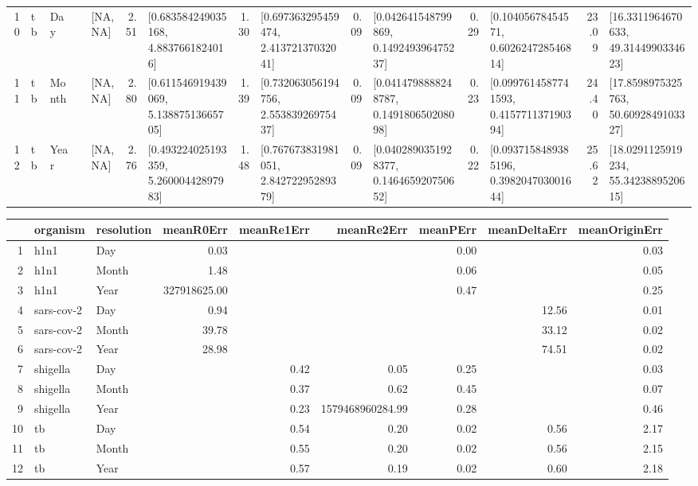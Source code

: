\documentclass{article}
\begin{document}
\begin{spacing}{1.5}
\begin{table}[ht]
\begin{tabular}{rllrlrlrlrlrlrl}
  10 & tb & Day &  & [NA, NA] & 2.51 & [0.683584249035168, 4.8837661824016] & 1.30 & [0.697363295459474, 2.41372137032041] & 0.09 & [0.042641548799869, 0.149249396475237] & 0.29 & [0.10405678454571, 0.602624728546814] & 23.09 & [16.3311964670633, 49.3144990334623] \\ 
  11 & tb & Month &  & [NA, NA] & 2.80 & [0.611546919439069, 5.13887513665705] & 1.39 & [0.732063056194756, 2.55383926975437] & 0.09 & [0.0414798888248787, 0.149180650208098] & 0.23 & [0.0997614587741593, 0.415771137190394] & 24.40 & [17.8598975325763, 50.6092849103327] \\ 
  12 & tb & Year &  & [NA, NA] & 2.76 & [0.493224025193359, 5.26000442897983] & 1.48 & [0.767673831981051, 2.84272295289379] & 0.09 & [0.0402890351928377, 0.146465920750652] & 0.22 & [0.0937158489385196, 0.398204703001644] & 25.62 & [18.0291125919234, 55.3423889520615] \\ 
   \hline
\end{tabular}
\end{table}

\begin{table}[ht]
\centering
\begin{tabular}{rllrrrrrr}
  \hline
 & organism & resolution & meanR0Err & meanRe1Err & meanRe2Err & meanPErr & meanDeltaErr & meanOriginErr \\ 
  \hline
1 & h1n1 & Day & 0.03 &  &  & 0.00 &  & 0.03 \\ 
  2 & h1n1 & Month & 1.48 &  &  & 0.06 &  & 0.05 \\ 
  3 & h1n1 & Year & 327918625.00 &  &  & 0.47 &  & 0.25 \\ 
  4 & sars-cov-2 & Day & 0.94 &  &  &  & 12.56 & 0.01 \\ 
  5 & sars-cov-2 & Month & 39.78 &  &  &  & 33.12 & 0.02 \\ 
  6 & sars-cov-2 & Year & 28.98 &  &  &  & 74.51 & 0.02 \\ 
  7 & shigella & Day &  & 0.42 & 0.05 & 0.25 &  & 0.03 \\ 
  8 & shigella & Month &  & 0.37 & 0.62 & 0.45 &  & 0.07 \\ 
  9 & shigella & Year &  & 0.23 & 1579468960284.99 & 0.28 &  & 0.46 \\ 
  10 & tb & Day &  & 0.54 & 0.20 & 0.02 & 0.56 & 2.17 \\ 
  11 & tb & Month &  & 0.55 & 0.20 & 0.02 & 0.56 & 2.15 \\ 
  12 & tb & Year &  & 0.57 & 0.19 & 0.02 & 0.60 & 2.18 \\ 
   \hline
\end{tabular}
\end{table}


\end{spacing}
\end{document}
